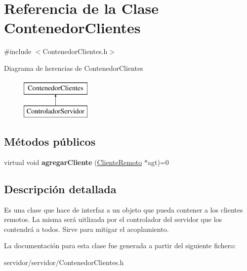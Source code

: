 \hypertarget{classContenedorClientes}{\section{\-Referencia de la \-Clase \-Contenedor\-Clientes}
\label{classContenedorClientes}
}


{\ttfamily \#include $<$\-Contenedor\-Clientes.\-h$>$}

\-Diagrama de herencias de \-Contenedor\-Clientes\begin{figure}[H]
\begin{center}
\leavevmode
\includegraphics[height=2.000000cm]{classContenedorClientes}
\end{center}
\end{figure}
\subsection*{\-Métodos públicos}
\begin{DoxyCompactItemize}
\item 
\hypertarget{classContenedorClientes_a87f11c5cf6e9259a9a79cb42a0a6f363}{virtual void {\bfseries agregar\-Cliente} (\hyperlink{classClienteRemoto}{\-Cliente\-Remoto} $\ast$agt)=0}\label{classContenedorClientes_a87f11c5cf6e9259a9a79cb42a0a6f363}

\end{DoxyCompactItemize}


\subsection{\-Descripción detallada}
\-Es una clase que hace de interfaz a un objeto que pueda contener a los clientes remotos. \-La misma será uitlizada por el controlador del servidor que los contendrá a todos. \-Sirve para mitigar el acoplamiento. 

\-La documentación para esta clase fue generada a partir del siguiente fichero\-:\begin{DoxyCompactItemize}
\item 
servidor/servidor/\-Contenedor\-Clientes.\-h\end{DoxyCompactItemize}
